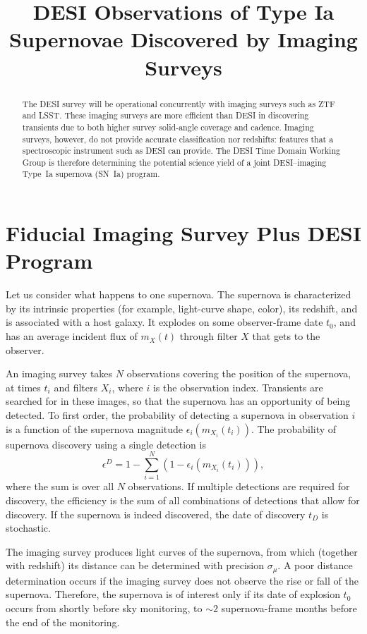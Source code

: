 \documentclass[onecolumn]{aastex61}   	%
\begin{document}
\title{DESI Observations of Type Ia Supernovae Discovered by Imaging Surveys}

\begin{abstract}
The DESI survey will be operational concurrently with imaging surveys such as ZTF and LSST.  These imaging surveys are more
efficient than DESI in discovering transients due to both higher survey solid-angle coverage and cadence.  Imaging surveys, however,
do not provide accurate classification nor redshifts: features that a spectroscopic instrument such as DESI can provide. The DESI Time Domain
Working Group is therefore determining the potential science yield of a joint DESI--imaging Type~Ia supernova (SN~Ia) program.
\end{abstract}

\section{Fiducial Imaging Survey Plus DESI Program}
Let us consider what happens to one supernova. The supernova is characterized by its intrinsic properties (for example, light-curve
shape, color), its redshift, and is associated with a host galaxy.  It explodes on some observer-frame date $t_0$, and has
an average incident flux of $m_X(t)$ through filter $X$ that gets to the observer. 

An imaging survey takes $N$ observations covering the position of the supernova, at times $t_i$ and filters $X_i$, where $i$ is the observation index.
Transients are searched for in these images, so that the supernova has an opportunity of being detected.
To first order, the probability of detecting a supernova
in observation $i$ is a function of the supernova magnitude  $\epsilon_i(m_{X_i}(t_i))$.  The probability of supernova
discovery using a single detection is
\begin{equation}
\epsilon^D = 1- \sum_{i=1}^{N} \left(1-\epsilon_i(m_{X_i}(t_i))\right),
\end{equation}
where the sum is over all $N$ observations.  If  multiple detections are required for discovery, the efficiency is the sum of all
combinations of detections that allow for discovery.
If the supernova is indeed discovered, the date of discovery $t_D$ is stochastic.  
 
The imaging survey produces light curves of the supernova, from which (together with redshift) its distance can be determined with precision $\sigma_\mu$.
A poor distance determination occurs if the imaging survey does not observe the rise or fall of the supernova.  Therefore,
the supernova is of interest only if its date of explosion $t_0$ occurs from shortly before sky monitoring, to $\sim 2$ supernova-frame months
before the end of the monitoring. 
 
\end{document}
